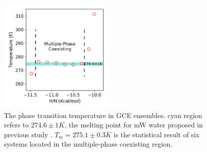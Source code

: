 \documentclass[aps,prl,twocolumn,superscriptaddress]{revtex4-1}
\begin{document}
 \begin{figure}[ht]
\centering{}\includegraphics[width=0.5\textwidth]{PTtemp-mw.png} 
\caption{The phase transition temperature in GCE ensembles. cyan region refers to $274.6\pm1K$, the melting point for mW water proposed in previous study \cite{Molinero2009}. $T_m=275.1\pm0.3K$ is the statistical result of six systems located in the multiple-phase coexisting region.
\label{fig:PTtemp-mw}} 
\end{figure}
\end{document}
